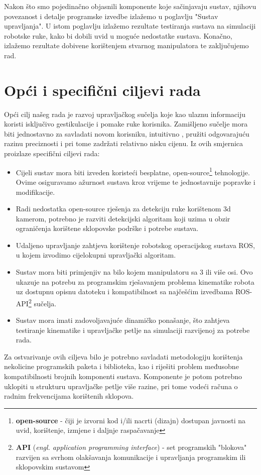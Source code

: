 \documentclass[times, utf8, diplomski, numeric]{fer}
\begin{document}
Nakon što smo pojedinačno objasnili komponente koje sačinjavaju sustav, njihovu povezanost i detalje programske izvedbe izlažemo u poglavlju "Sustav upravljanja".
U istom poglavlju izlažemo rezultate testiranja sustava na simulaciji robotske ruke, kako bi dobili uvid u moguće nedostatke sustava.
Konačno, izlažemo rezultate dobivene korištenjem stvarnog manipulatora te zaključujemo rad.

\chapter{Opći i specifični ciljevi rada}
Opći cilj našeg rada je razvoj upravljačkog sučelja koje kao ulaznu informaciju koristi isključivo gestikulacije i pomake ruke korisnika.
Zamišljeno sučelje mora biti jednostavno za savladati novom korisniku, intuitivno , pružiti odgovarajuću razinu preciznosti i pri tome zadržati relativno nisku cijenu.
Iz ovih smjernica proizlaze specifični ciljevi rada:
\begin{itemize}
\item Cijeli sustav mora biti izveden koristeći besplatne, open-source\footnote{\textbf{open-source} - čiji je izvorni kod i/ili nacrti (dizajn) dostupan javnosti na uvid, korištenje, izmjene i daljnje raspačavanje} tehnologije. 
Ovime osiguravamo ažurnost sustava kroz vrijeme te jednostavnije popravke i modifikacije.
\item Radi nedostatka open-source rješenja za detekciju ruke korištenom 3d kamerom, potrebno je razviti detekcijski algoritam koji uzima u obzir ograničenja korištene sklopovske podrške i potrebe sustava.
\item Udaljeno upravljanje zahtjeva korištenje robotskog operacijskog sustava ROS, u kojem izvodimo cijelokupni upravljački algoritam.
\item Sustav mora biti primjenjiv na bilo kojem manipulatoru sa 3 ili više osi. Ovo ukazuje na potrebu za programskim rješavanjem problema kinematike robota uz dostupnu opisnu datoteku i kompatibilnost sa najčešćim izvedbama ROS-API\footnote{\textbf{API} (\textit{engl. application programming interface}) - set programskih "blokova" razvijen sa svrhom olakšavanja komunikacije i upravljanja programskim ili sklopovskim sustavom} sučelja.
\item Sustav mora imati zadovoljavajuće dinamičko ponašanje, što zahtjeva testiranje kinematike i upravljačke petlje na simulaciji razvijenoj za potrebe rada.
\end{itemize}

Za ostvarivanje ovih ciljeva bilo je potrebno savladati metodologiju korištenja nekolicine programskih paketa i biblioteka, kao i riješiti problem međusobne kompatibilnosti brojnih komponenti sustava.
Komponente je potom potrebno uklopiti u strukturu upravljačke petlje više razine, pri tome vodeći računa o radnim frekvencijama korištenih sklopova.
\end{document}
